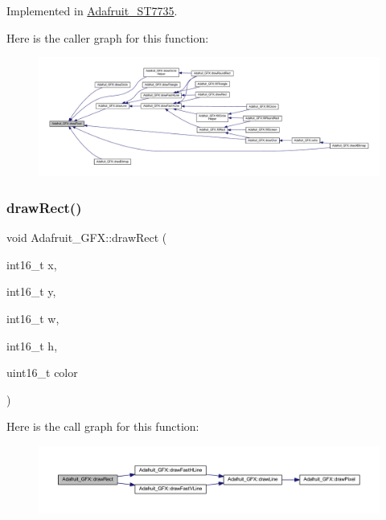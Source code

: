 Implemented in \hyperlink{class_adafruit___s_t7735_af22a5ba7282850793f4943ba2d682af0}{Adafruit\+\_\+\+S\+T7735}.

Here is the caller graph for this function\+:\nopagebreak
\begin{figure}[H]
\begin{center}
\leavevmode
\includegraphics[width=350pt]{class_adafruit___g_f_x_ab7fbf72885c873266f9c7eb53b5c8896_icgraph}
\end{center}
\end{figure}
\mbox{\label{class_adafruit___g_f_x_a9ec2c2ab426503e4f7deddb93bb916f6}} 
\subsubsection{\texorpdfstring{draw\+Rect()}{drawRect()}}
{\footnotesize\ttfamily void Adafruit\+\_\+\+G\+F\+X\+::draw\+Rect (\begin{DoxyParamCaption}\item[{int16\+\_\+t}]{x,  }\item[{int16\+\_\+t}]{y,  }\item[{int16\+\_\+t}]{w,  }\item[{int16\+\_\+t}]{h,  }\item[{uint16\+\_\+t}]{color }\end{DoxyParamCaption})}

Here is the call graph for this function\+:\nopagebreak
\begin{figure}[H]
\begin{center}
\leavevmode
\includegraphics[width=350pt]{class_adafruit___g_f_x_a9ec2c2ab426503e4f7deddb93bb916f6_cgraph}
\end{center}
\end{figure}
\mbox{\label{class_adafruit___g_f_x_ab496b247abec724ef80e17a30257972b}} 
